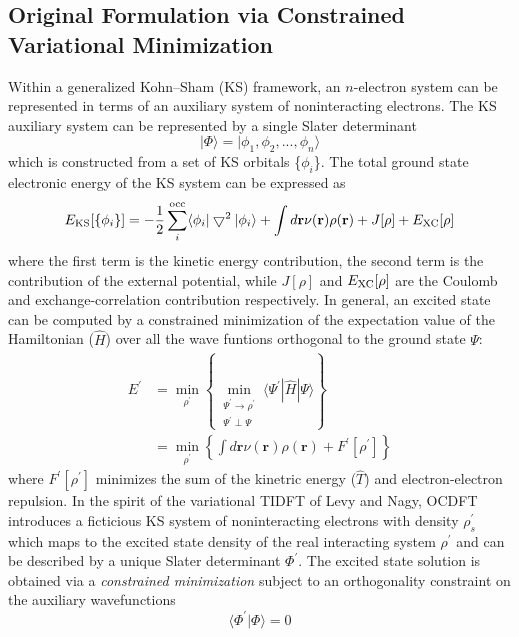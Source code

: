 \documentclass[final]{emory}
\begin{document}
\subsection{Original Formulation via Constrained Variational Minimization}
Within a generalized Kohn--Sham (KS) framework, an $n$-electron system can be represented in terms of an auxiliary system of noninteracting electrons. The KS auxiliary system can be represented by a single Slater determinant 
\begin{equation}
|\Phi\rangle = | \phi_1, \phi_2, ..., \phi_n \rangle
\end{equation}
which is constructed from a set of KS orbitals \{$\phi_i$\}. The total ground state electronic energy of the KS system can be expressed as
\begin{equation}
E_{\rm KS}[\{\phi_i\}] = - \frac{1}{2} \sum^{\rm occ}_i \langle \phi_i| \bigtriangledown^2 | \phi_i \rangle + \int d\mathbf{r} \nu(\mathbf{r}) \rho(\mathbf{r}) + J[\rho] + E_{\rm XC}[\rho]
\end{equation}
where the first term is the kinetic energy contribution, the second term is the contribution of the external potential, while $J[\rho]$ and $E_{\rm XC}[\rho]$ are the Coulomb and exchange-correlation contribution respectively. In general, an excited state can be computed by a constrained minimization of the expectation value of the Hamiltonian ($\hat{H}$) over all the wave funtions orthogonal to the ground state $\Psi$:
\begin{align}
E^{\prime} &= \min_{\rho^{\prime}}\left\{\min_{\substack{\Psi^{\prime} \rightarrow \rho^{\prime} \\ \Psi^{\prime} \perp \Psi}} \langle \Psi^{\prime}| \hat{H} | \Psi\rangle \right\} \\
&= \min_{\rho^{\prime}}\left\{ \int d\mathbf{r} \nu(\mathbf{r}) \rho(\mathbf{r}) + F^{\prime}[\rho^{\prime}]\right\}
\end{align}
where $F^{\prime}[\rho^{\prime}]$ minimizes the sum of the kinetric energy ($\hat{T}$) and electron-electron repulsion. In the spirit of the variational TIDFT of Levy and Nagy, OCDFT introduces a ficticious KS system of noninteracting electrons with density $\rho^{\prime}_s$ which maps to the excited state density of the real interacting system $\rho^{\prime}$ and can be described by a unique Slater determinant $\Phi^{\prime}$. The excited state solution is obtained via a \textit{constrained minimization} subject to an orthogonality constraint on the auxiliary wavefunctions
\begin{equation}
\langle \Phi^{\prime}|\Phi \rangle = 0
\end{equation}
\end{document}

